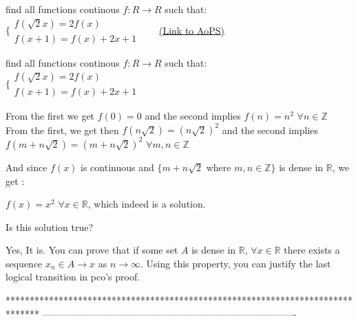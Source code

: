 \begin{problem}
	find all functions continous $ f:R\rightarrow R $ such that:
$ \{\begin{matrix}
f(\sqrt{2}x)=2f(x) &  & \\ 
f(x+1)=f(x)+2x+1 &  & 
\end{matrix} $
	\flushright \href{https://artofproblemsolving.com/community/c6h602829}{(Link to AoPS)}
\end{problem}



\begin{solution}
	\begin{tcolorbox}find all functions continous $ f:R\rightarrow R $ such that:
$ \{\begin{matrix}
f(\sqrt{2}x)=2f(x) &  & \\ 
f(x+1)=f(x)+2x+1 &  & 
\end{matrix} $\end{tcolorbox}
From the first we get $f(0)=0$ and the second implies $f(n)=n^2$ $\forall n\in\mathbb Z$
From the first, we get then $f(n\sqrt 2)=(n\sqrt 2)^2$ and the second implies $f(m+n\sqrt 2)=(m+n\sqrt 2)^2$ $\forall m,n\in\mathbb Z$

And since $f(x)$ is continuous and $\{m+n\sqrt 2$ where $m,n\in\mathbb Z\}$ is dense in $\mathbb R$, we get :

$\boxed{f(x)=x^2}$ $\forall x\in\mathbb R$, which indeed is a solution.
\end{solution}



\begin{solution}
	Is this solution true?
\end{solution}



\begin{solution}
	Yes, It is. You can prove that if some set $A$ is dense in $\mathbb{R}$, $\forall x\in \mathbb{R}$ there exists a sequence $x_n\in A \rightarrow x$ as $n\rightarrow \infty$. Using this property, you can justify the last logical transition in pco's proof.
\end{solution}
*******************************************************************************
-------------------------------------------------------------------------------

